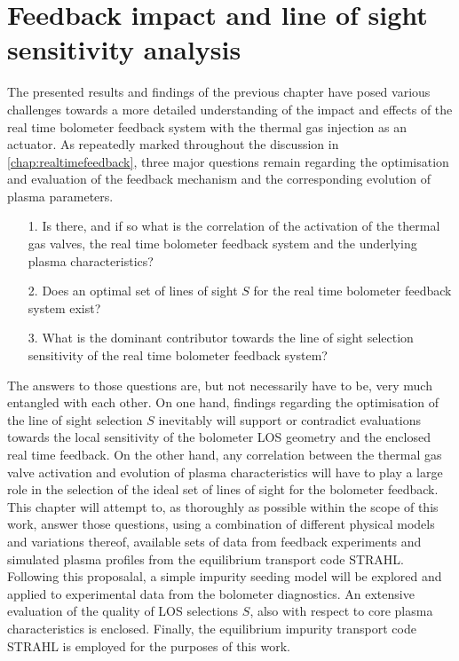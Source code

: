 %
\chapter{Feedback impact and line of sight sensitivity analysis}\label{chap:feedbackeval}%
%
    The presented results and findings of the previous chapter have posed various challenges towards a more detailed understanding of the impact and effects of the real time bolometer feedback system with the thermal gas injection as an actuator. As repeatedly marked throughout the discussion in \cref{chap:realtimefeedback}, three major questions remain regarding the optimisation and evaluation of the feedback mechanism and the corresponding evolution of plasma parameters.%
%
    \begin{enumerate}%
        \item[1.]{%
            Is there, and if so what is the correlation of the activation of the thermal gas valves, the real time bolometer feedback system and the underlying plasma characteristics?}%
        \item[2.]{%
            Does an optimal set of lines of sight $S$ for the real time bolometer feedback system exist?}%
        \item[3.]{%
            What is the dominant contributor towards the line of sight selection sensitivity of the real time bolometer feedback system?}%
    \end{enumerate}%
%
    The answers to those questions are, but not necessarily have to be, very much entangled with each other. On one hand, findings regarding the optimisation of the line of sight selection $S$ inevitably will support or contradict evaluations towards the local sensitivity of the bolometer LOS geometry and the enclosed real time feedback. On the other hand, any correlation between the thermal gas valve activation and evolution of plasma characteristics will have to play a large role in the selection of the ideal set of lines of sight for the bolometer feedback.\\%
    This chapter will attempt to, as thoroughly as possible within the scope of this work, answer those questions, using a combination of different physical models and variations thereof, available sets of data from feedback experiments and simulated plasma profiles from the equilibrium transport code STRAHL. Following this proposalal, a simple impurity seeding model will be explored and applied to experimental data from the bolometer diagnostics. An extensive evaluation of the quality of LOS selections $S$, also with respect to core plasma characteristics is enclosed. Finally, the equilibrium impurity transport code STRAHL is employed for the purposes of this work.%
%

